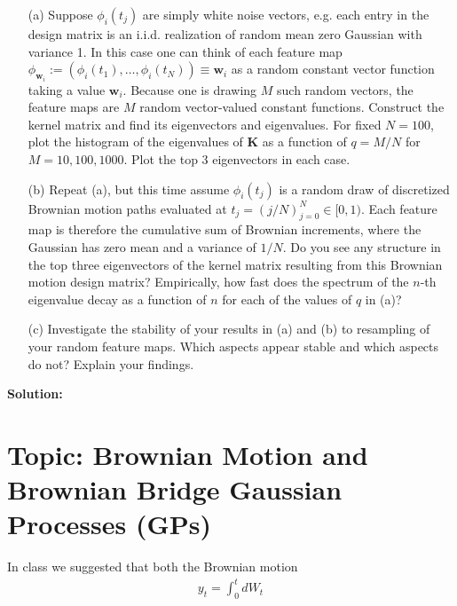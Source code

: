 \documentclass[11pt]{article}
\theoremstyle{plain} %
\newenvironment{solution}
{\color{C2}\normalfont\begin{framed}\begingroup\textbf{Solution:} }
  {\endgroup\end{framed}}
\theoremstyle{remark}
\begin{document}
\begin{enumerate}
  \item[(a)] Suppose \(\phi_{i}\left(t_{j}\right)\) are simply white noise
  vectors, e.g. each entry in the design matrix is an i.i.d. realization of
  random mean zero Gaussian with variance 1. In this case one can think of each
  feature map \(\phi_{\mathbf{w}_i}:= \left(\phi_i(t_{1}), \ldots, \phi_i(t_{N})\right)\equiv \mathbf{w}_i\)
  as a random constant vector function taking a value \(\mathbf{w}_i\). Because
  one is drawing \(M\) such random vectors, the feature maps are \(M\) random
  vector-valued constant functions. Construct the kernel matrix and find its
  eigenvectors and eigenvalues. For fixed \(N=100\), plot the histogram of the
  eigenvalues of \(\mathbf{K}\) as a function of \(q=M / N\) for
  \(M=10,100,1000\). Plot the top 3 eigenvectors in each case.
  \item[(b)] Repeat (a), but this time assume \(\phi_{i}\left(t_{j}\right)\) is
  a random draw of discretized Brownian motion paths evaluated at \(t_{j}=(j /
  N)_{j=0}^{N} \in[0,1)\). Each feature map is therefore the cumulative sum of
  Brownian increments, where the Gaussian has zero mean and a variance of \(1 /
  N\). Do you see any structure in the top three eigenvectors of the kernel
  matrix resulting from this Brownian motion design matrix? Empirically, how
  fast does the spectrum of the \(n\)-th eigenvalue decay as a function of \(n\)
  for each of the values of \(q\) in (a)?
  \item[(c)] Investigate the stability of your results in (a) and (b) to
  resampling of your random feature maps. Which aspects appear stable and which
  aspects do not? Explain your findings.
\end{enumerate}

\begin{solution}

\end{solution}


\section{Topic: Brownian Motion and Brownian Bridge Gaussian Processes (GPs)}

In class we suggested that both the Brownian motion
\begin{align}
  y_{t}=\int_{0}^{t} d W_{t} \label{eq:brownian motion}
\end{align}
\end{document}
